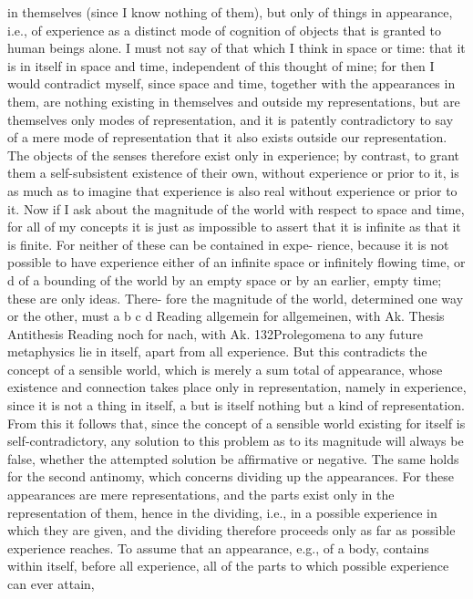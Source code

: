 in themselves (since I know nothing of them), but only of things in
appearance, i.e., of experience as a distinct mode of cognition of objects
that is granted to human beings alone. I must not say of that which I
think in space or time: that it is in itself in space and time, independent
of this thought of mine; for then I would contradict myself, since space
and time, together with the appearances in them, are nothing existing
in themselves and outside my representations, but are themselves only
modes of representation, and it is patently contradictory to say of a mere
mode of representation that it also exists outside our representation. The
objects of the senses therefore exist only in experience; by contrast, to
grant them a self-subsistent existence of their own, without experience
or prior to it, is as much as to imagine that experience is also real without
experience or prior to it.
Now if I ask about the magnitude of the world with respect to space
and time, for all of my concepts it is just as impossible to assert that it is
inﬁnite as that it is ﬁnite. For neither of these can be contained in expe-
rience, because it is not possible to have experience either of an inﬁnite
space or inﬁnitely ﬂowing time, or d of a bounding of the world by an
empty space or by an earlier, empty time; these are only ideas. There-
fore the magnitude of the world, determined one way or the other, must
a
b
c
d
Reading allgemein for allgemeinen, with Ak.
Thesis
Antithesis
Reading noch for nach, with Ak.
132Prolegomena to any future metaphysics
lie in itself, apart from all experience. But this contradicts the concept
of a sensible world, which is merely a sum total of appearance, whose
existence and connection takes place only in representation, namely in
experience, since it is not a thing in itself, a but is itself nothing but a
kind of representation. From this it follows that, since the concept of a
sensible world existing for itself is self-contradictory, any solution to this
problem as to its magnitude will always be false, whether the attempted
solution be afﬁrmative or negative.
The same holds for the second antinomy, which concerns dividing
up the appearances. For these appearances are mere representations,
and the parts exist only in the representation of them, hence in the
dividing, i.e., in a possible experience in which they are given, and the
dividing therefore proceeds only as far as possible experience reaches. To
assume that an appearance, e.g., of a body, contains within itself, before
all experience, all of the parts to which possible experience can ever attain,
